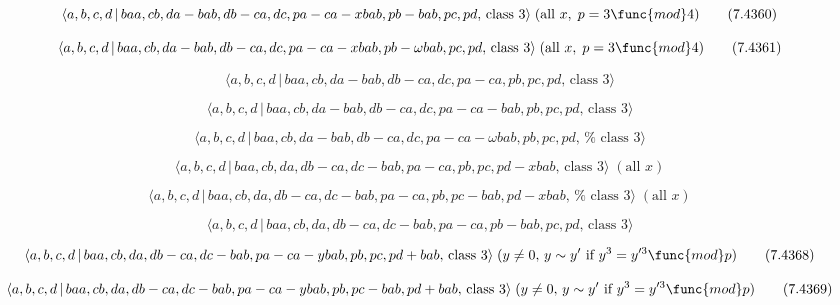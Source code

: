 \documentclass[10pt]{article}
\begin{document}
\begin{equation}
\langle a,b,c,d\,|\,baa,cb,da-bab,db-ca,dc,pa-ca-xbab,pb-bab,pc,pd,\,\text{%
class }3\rangle \;(\text{all }x,\;p=3\func{mod}4)  \tag{7.4360}
\end{equation}

\begin{equation}
\langle a,b,c,d\,|\,baa,cb,da-bab,db-ca,dc,pa-ca-xbab,pb-\omega bab,pc,pd,\,%
\text{class }3\rangle \;(\text{all }x,\;p=3\func{mod}4)  \tag{7.4361}
\end{equation}

\begin{equation}
\langle a,b,c,d\,|\,baa,cb,da-bab,db-ca,dc,pa-ca,pb,pc,pd,\,\text{class }%
3\rangle  \tag{7.4362}
\end{equation}

\begin{equation}
\langle a,b,c,d\,|\,baa,cb,da-bab,db-ca,dc,pa-ca-bab,pb,pc,pd,\,\text{class }%
3\rangle  \tag{7.4363}
\end{equation}

\begin{equation}
\langle a,b,c,d\,|\,baa,cb,da-bab,db-ca,dc,pa-ca-\omega bab,pb,pc,pd,\,\text{%
class }3\rangle  \tag{7.4364}
\end{equation}

\begin{equation}
\langle a,b,c,d\,|\,baa,cb,da,db-ca,dc-bab,pa-ca,pb,pc,pd-xbab,\,\text{class 
}3\rangle \;(\text{all }x)  \tag{7.4365}
\end{equation}

\begin{equation}
\langle a,b,c,d\,|\,baa,cb,da,db-ca,dc-bab,pa-ca,pb,pc-bab,pd-xbab,\,\text{%
class }3\rangle \;(\text{all }x)  \tag{7.4366}
\end{equation}

\begin{equation}
\langle a,b,c,d\,|\,baa,cb,da,db-ca,dc-bab,pa-ca,pb-bab,pc,pd,\,\text{class }%
3\rangle  \tag{7.4367}
\end{equation}

\begin{equation}
\langle a,b,c,d\,|\,baa,cb,da,db-ca,dc-bab,pa-ca-ybab,pb,pc,pd+bab,\,\text{%
class }3\rangle \;(y\neq 0,\,y\sim y^{\prime }\text{ if }y^{3}=y^{\prime 3}%
\func{mod}p)  \tag{7.4368}
\end{equation}

\begin{equation}
\langle a,b,c,d\,|\,baa,cb,da,db-ca,dc-bab,pa-ca-ybab,pb,pc-bab,pd+bab,\,%
\text{class }3\rangle \;(y\neq 0,\,y\sim y^{\prime }\text{ if }%
y^{3}=y^{\prime 3}\func{mod}p)  \tag{7.4369}
\end{equation}
\end{document}
